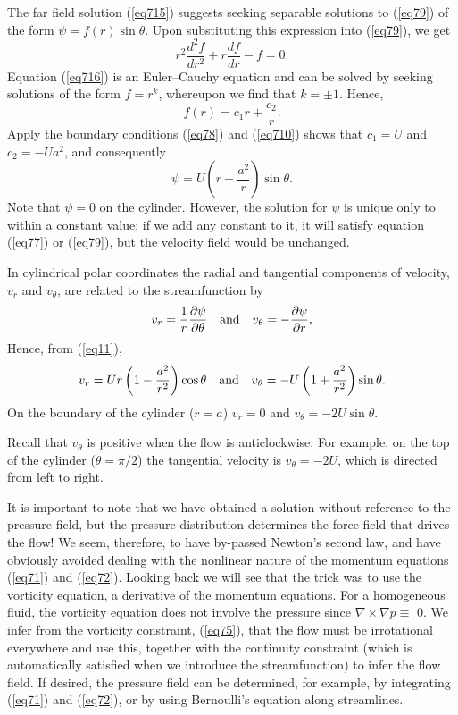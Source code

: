\documentclass[10pt]{report}
\begin{document}
The far field solution (\ref{eq715}) suggests seeking separable solutions to (\ref{eq79})
of the form $\psi =f\left( r \right)\sin \theta $. Upon substituting this
expression into (\ref{eq79}), we get
\begin{equation}
\label{eq716}
r^2\frac{d^2f}{dr^2}+r\frac{df}{dr}-f=0.
\end{equation}
Equation (\ref{eq716}) is an Euler--Cauchy equation and can be solved by seeking
solutions of the form $f=r^k$, whereupon we find that $ k = \pm  1$. Hence,
\[
f(r)=c_1 r+\frac{c_2 }{r}.
\]
Apply the boundary conditions (\ref{eq78}) and (\ref{eq710}) shows that $c_{1} = U$ and
$c_{2} = -Ua^{2}$, and consequently
\begin{equation}
\label{eq717}
\psi =U\left( {r-\frac{a^2}{r}} \right)\sin \theta .
\end{equation}
Note that $\psi  = 0$ on the cylinder. However, the solution for
$\psi $ is unique only to within a constant value; if we add any constant to
it, it will satisfy equation (\ref{eq77}) or (\ref{eq79}), but the velocity field would
be unchanged.

In cylindrical polar coordinates the radial and tangential components of
velocity, $v_{r}$ and $v_{\theta }$, are related to the streamfunction by
\[ v_r =\frac{1}{r}\frac{\partial \psi }{\partial \theta }\quad \hbox{and} \quad v_\theta
=-\frac{\partial \psi }{\partial r}, \]
Hence, from (\ref{eq11}),
\[ v_r =Ur\left( {1-\frac{a^2}{r^2}} \right)\cos \theta \quad \hbox{and} \quad v_\theta
=-U\left( {1+\frac{a^2}{r^2}} \right)\sin \theta . \]
On the boundary of the cylinder ($r = a$) $v_{r} = 0$ and $v_{\theta } =
-2U\sin \theta $.

Recall that $v_{\theta }$ is positive when the flow is anticlockwise. For
example, on the top of the cylinder ($\theta =\pi /2$) the tangential
velocity is $v_{\theta } = -2U$, which is directed from left to right.

It is important to note that we have obtained a solution without reference
to the pressure field, but the pressure distribution determines the force
field that drives the flow! We seem, therefore, to have by-passed Newton's
second law, and have obviously avoided dealing with the nonlinear nature of
the momentum equations (\ref{eq71}) and (\ref{eq72}). Looking back we will see that the
trick was to use the vorticity equation, a derivative of the momentum
equations. For a homogeneous fluid, the vorticity equation does not involve
the pressure since $\nabla \times \nabla p \equiv $ 0. We infer from
the vorticity constraint, (\ref{eq75}), that the flow must be irrotational
everywhere and use this, together with the continuity constraint (which is
automatically satisfied when we introduce the streamfunction) to infer the
flow field. If desired, the pressure field can be determined, for example,
by integrating (\ref{eq71}) and (\ref{eq72}), or by using Bernoulli's equation along
streamlines.
\end{document}
